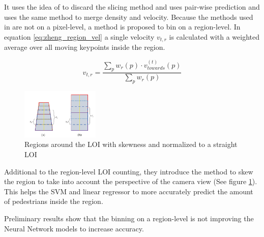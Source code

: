 It uses the idea of \cite{leibe_crossing-line_2016} to discard the slicing method and uses pair-wise prediction and uses the same method to merge density and velocity. Because the methods used in \cite{zheng_cross-line_2019} are not on a pixel-level, a method is proposed to bin on a region-level. In equation \ref{eq:zheng_region_vel} a single velocity $v_{t,r}$ is calculated with a weighted average over all moving keypoints inside the region.

\begin{equation}
	v_{t,r} = \frac{\sum_p w_r(p) \cdot v^{(t)}_{towards}(p)}{\sum_p w_r(p)}
	\label{eq:zheng_region_vel}
\end{equation}

\begin{figure}[h]
\centering
\includegraphics[width=0.33\textwidth]{images/zheng19_regions}
\caption{Regions around the LOI with skewness and normalized to a straight LOI}
\label{fig:zheng_skew}
\end{figure}

Additional to the region-level LOI counting, they introduce the method to skew the region to take into account the perspective of the camera view (See figure \ref{fig:zheng_skew}). This helps the SVM and linear regressor to more accurately predict the amount of pedestrians inside the region.

Preliminary results show that the binning on a region-level is not improving the Neural Network models to increase accuracy.
